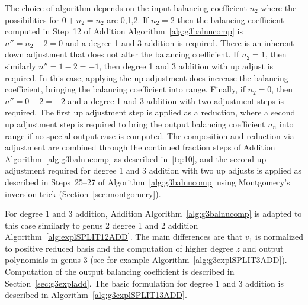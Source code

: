 The choice of algorithm depends on the input balancing coefficient $n_2$ where
the possibilities for $0 + n_2 = n_2$ are 0,1,2. If $n_2 = 2$ then the balancing
coefficient computed in Step~12 of Addition Algorithm~\ref{alg:g3balnucomp} is
$n'' = n_2-2 = 0$ and a degree 1 and 3 addition is required. There is an
inherent down adjustment that does not alter the balancing coefficient. If
$n_2=1$, then similarly $n'' = 1 - 2= -1$, then degree 1 and 3 addition with up
adjust is required. In this case, applying the up adjustment does increase the
balancing coefficient, bringing the balancing coefficient into range. Finally,
if $n_2 = 0$, then $n'' = 0 - 2 = -2$ and a degree 1 and 3 addition with two
adjustment steps is required. The first up adjustment step is applied as a
reduction, where a second up adjustment step is required to bring the
output balancing coefficient $n_n$ into range if no special output case is
computed. The composition and reduction via adjustment are combined through the
continued fraction steps of Addition Algorithm~\ref{alg:g3balnucomp} as
described in~\ref{tq:10}, and the second up adjustment required for degree 1 and
3 addition with two up adjusts is applied as described in Steps~25--27 of
Algorithm~\ref{alg:g3balnucomp} using Montgomery's inversion trick
(Section~\ref{sec:montgomery}). 

For degree 1 and 3 addition, Addition Algorithm~\ref{alg:g3balnucomp} is adapted
to this case similarly to genus 2 degree 1 and 2 addition
Algorithm~\ref{alg:explSPLIT12ADD}.  The main differences are that $v_1$ is
normalized to positive reduced basis and the computation of higher degree $z$
and output polynomials in genus 3 (see for example
Algorithm~\ref{alg:g3explSPLIT3ADD}).  Computation of the output balancing
coefficient is described in Section~\ref{sec:g3expladd}. The basic formulation
for degree 1 and 3 addition is described in
Algorithm~\ref{alg:g3explSPLIT13ADD}.

